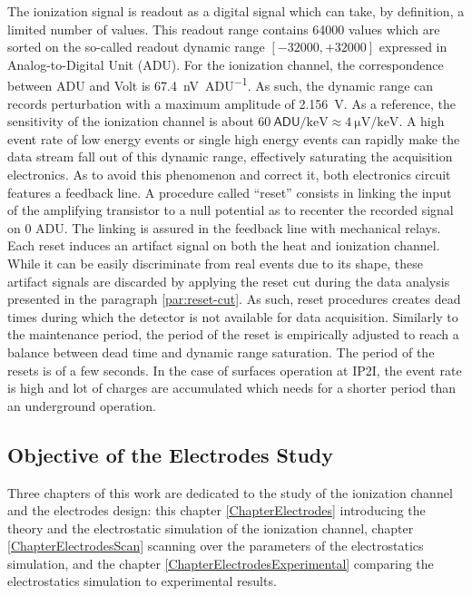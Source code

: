 The ionization signal is readout as a digital signal which can take, by definition, a limited number of values. This readout range contains 64000 values which are sorted on the so-called readout dynamic range $[-32000, +32000]$ expressed in Analog-to-Digital Unit (ADU). For the ionization channel, the correspondence between ADU and Volt is \SI{67.4}{\nano\volt\per\textsf{ADU}}. As such, the dynamic range can records perturbation with a maximum amplitude of \SI{2.156}{\volt}. As a reference, the sensitivity of the ionization channel is about $\SI{60}{\textsf{ADU}\per\kilo\eV} \approx \SI{4}{\micro\volt\per\kilo\eV}$. A high event rate of low energy events or single high energy events can rapidly make the data stream fall out of this dynamic range, effectively saturating the acquisition electronics.
As to avoid this phenomenon and correct it, both electronics circuit features a feedback line. A procedure called “reset” consists in linking the input of the amplifying transistor to a null potential as to recenter the recorded signal on 0 ADU. The linking is assured in the feedback line with mechanical relays. Each reset induces an artifact signal on both the heat and ionization channel. While it can be easily discriminate from real events due to its shape, these artifact signals are discarded by applying the reset cut during the data analysis presented in the paragraph \ref{par:reset-cut}. As such, reset procedures creates dead times during which the detector is not available for data acquisition. Similarly to the maintenance period, the period of the reset is empirically adjusted to reach a balance between dead time and dynamic range saturation. The period of the resets is of a few seconds. In the case of surfaces operation at IP2I, the event rate is high and lot of charges are accumulated which needs for a shorter period than an underground operation.



\subsection{Objective of the Electrodes Study}
\label{par:ionization-objective}

Three chapters of this work are dedicated to the study of the ionization channel and the electrodes design: this chapter \ref{ChapterElectrodes} introducing the theory and the electrostatic simulation of the ionization channel,  chapter \ref{ChapterElectrodesScan} scanning over the parameters of the electrostatics simulation, and the chapter \ref{ChapterElectrodesExperimental} comparing the electrostatics simulation to experimental results.

